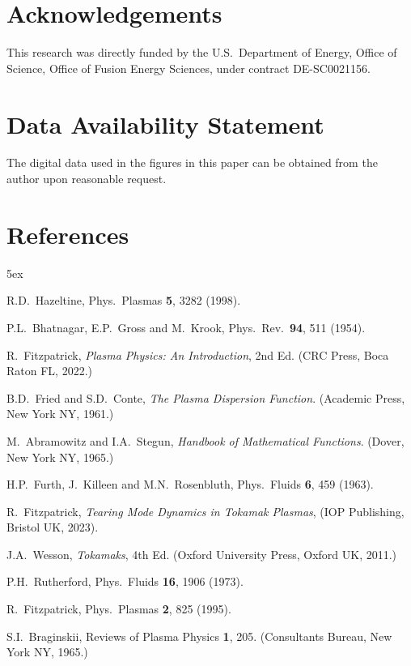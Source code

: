 \documentclass[12pt,prb,aps]{revtex4-1}
\begin{document}
 
\section*{Acknowledgements}
This research was directly funded by the U.S.\ Department of Energy, Office of Science, Office of Fusion Energy Sciences, under  contract DE-SC0021156. 

\section*{Data Availability Statement}
The digital data used in the figures in this paper can be obtained from the author upon reasonable request.

\section*{References}
\begin{thebibliography}{99}\baselineskip 5ex

 R.D.~Hazeltine, Phys.\ Plasmas {\bf 5}, 3282 (1998).

 P.L.~Bhatnagar, E.P.~Gross and M.~Krook, Phys.\ Rev.\ {\bf 94}, 511 (1954).

 R.~Fitzpatrick, {\em Plasma Physics: An Introduction}, 2nd Ed. (CRC Press, Boca Raton FL, 2022.)

 B.D.~Fried and S.D.~Conte, {\em The Plasma Dispersion Function}. (Academic Press, New York NY, 1961.)

 M.~Abramowitz and I.A.~Stegun, {\em Handbook of Mathematical Functions}. (Dover, New York NY, 1965.)

 H.P.~Furth,  J.~Killeen and M.N.~Rosenbluth,  Phys.\ Fluids {\bf 6}, 459 (1963).

 R.~Fitzpatrick, {\em Tearing Mode Dynamics in Tokamak Plasmas}, (IOP Publishing, Bristol UK, 2023).

 J.A.~Wesson, {\em Tokamaks}, 4th Ed. (Oxford University Press, Oxford UK, 2011.)

 P.H.~Rutherford, Phys.\ Fluids {\bf 16}, 1906 (1973).

 R.~Fitzpatrick, Phys.\ Plasmas {\bf 2}, 825 (1995).

 S.I.~Braginskii, Reviews of Plasma Physics {\bf 1}, 205.  (Consultants Bureau, New York NY, 1965.)

\end{thebibliography}
\end{document}
